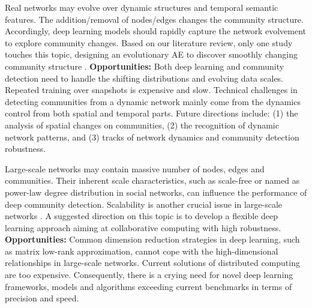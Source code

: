 Real networks may evolve over dynamic structures and temporal semantic features. The addition/removal of nodes/edges changes the community structure. Accordingly, deep learning models should rapidly capture the network evolvement to explore community changes. Based on our literature review, only one study touches this topic, designing an evolutionary AE to discover smoothly changing community structure .
\vspace{2mm}
\noindent
\textbf{Opportunities:} Both deep learning and community detection need to handle the shifting distributions and evolving data scales. Repeated training over snapshots is expensive and slow. Technical challenges in detecting communities from a dynamic network mainly come from the dynamics control from both spatial and temporal parts. Future directions include: (1) the analysis of spatial changes on communities, (2) the recognition of dynamic network patterns, and (3) tracks of network dynamics and community detection robustness.

Large-scale networks may contain massive number of nodes, edges and communities. Their inherent scale characteristics, such as scale-free or named as power-law degree distribution  in social networks, can influence the performance of deep community detection. Scalability is another crucial issue in large-scale networks . A suggested direction on this topic is to develop a flexible deep learning approach aiming at collaborative computing with high robustness.
\vspace{2mm}
\noindent
\textbf{Opportunities:} Common dimension reduction strategies in deep learning, such as matrix low-rank approximation, cannot cope with the high-dimensional relationships in large-scale networks. Current solutions of distributed computing are too expensive. Consequently, there is a crying need for novel deep learning frameworks, models and algorithms exceeding current benchmarks in terms of precision and speed.


